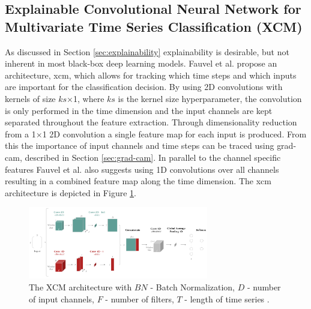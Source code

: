 
\subsection{Explainable Convolutional Neural Network for Multivariate Time Series Classification (XCM)} \label{sec:XCM}
As discussed in Section \ref{sec:explainability} explainability is desirable, but not inherent in most black-box deep learning models. Fauvel et al. \cite{Fauvel2020} propose an architecture, \gls{xcm}, which allows for tracking which time steps and which inputs are important for the classification decision. By using 2D convolutions with kernels of size $ks$$\times$1, where $ks$ is the kernel size hyperparameter, the convolution is only performed in the time dimension and the input channels are kept separated throughout the feature extraction. Through dimensionality reduction from a 1$\times$1 2D convolution a single feature map for each input is produced. From this the importance of input channels and time steps can be traced using \gls{grad-cam}, described in Section \ref{sec:grad-cam}. In parallel to the channel specific features Fauvel et al. also suggests using 1D convolutions over all channels resulting in a combined feature map along the time dimension. The \gls{xcm} architecture is depicted in Figure \ref{fig:xcm}.

\begin{figure}
  \centering
  \includegraphics[width=0.7\textwidth]{files/figs/xcm.png}
  \caption{The XCM architecture with $BN$ - Batch Normalization, $D$ - number of input channels, $F$ - number of filters, $T$ - length of time series \cite{Fauvel2020}.}
  \label{fig:xcm}
\end{figure}

